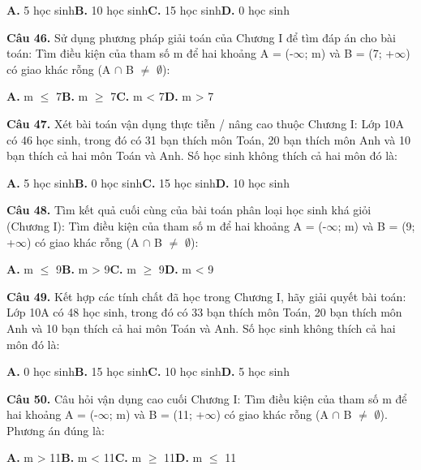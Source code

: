 \documentclass[11pt,a4paper]{article}
\begin{document}
\hspace*{1.5em}\textbf{A.} 5 học sinh\quad\quad \textbf{B.} 10 học sinh\quad\quad \textbf{C.} 15 học sinh\quad\quad \textbf{D.} 0 học sinh\par\vspace{2pt}
\textbf{\color{primary} Câu 46.} Sử dụng phương pháp giải toán của Chương I để tìm đáp án cho bài toán: Tìm điều kiện của tham số m để hai khoảng A = (-$\infty$; m) và B = (7; +$\infty$) có giao khác rỗng (A $\cap$ B $\ne$ $\emptyset$):\par
\hspace*{1.5em}\textbf{A.} m $\le$ 7\quad\quad \textbf{B.} m $\ge$ 7\quad\quad \textbf{C.} m < 7\quad\quad \textbf{D.} m > 7\par\vspace{2pt}
\textbf{\color{primary} Câu 47.} Xét bài toán vận dụng thực tiễn / nâng cao thuộc Chương I: Lớp 10A có 46 học sinh, trong đó có 31 bạn thích môn Toán, 20 bạn thích môn Anh và 10 bạn thích cả hai môn Toán và Anh. Số học sinh không thích cả hai môn đó là:\par
\hspace*{1.5em}\textbf{A.} 5 học sinh\quad\quad \textbf{B.} 0 học sinh\quad\quad \textbf{C.} 15 học sinh\quad\quad \textbf{D.} 10 học sinh\par\vspace{2pt}
\textbf{\color{primary} Câu 48.} Tìm kết quả cuối cùng của bài toán phân loại học sinh khá giỏi (Chương I): Tìm điều kiện của tham số m để hai khoảng A = (-$\infty$; m) và B = (9; +$\infty$) có giao khác rỗng (A $\cap$ B $\ne$ $\emptyset$):\par
\hspace*{1.5em}\textbf{A.} m $\le$ 9\quad\quad \textbf{B.} m > 9\quad\quad \textbf{C.} m $\ge$ 9\quad\quad \textbf{D.} m < 9\par\vspace{2pt}
\textbf{\color{primary} Câu 49.} Kết hợp các tính chất đã học trong Chương I, hãy giải quyết bài toán: Lớp 10A có 48 học sinh, trong đó có 33 bạn thích môn Toán, 20 bạn thích môn Anh và 10 bạn thích cả hai môn Toán và Anh. Số học sinh không thích cả hai môn đó là:\par
\hspace*{1.5em}\textbf{A.} 0 học sinh\quad\quad \textbf{B.} 15 học sinh\quad\quad \textbf{C.} 10 học sinh\quad\quad \textbf{D.} 5 học sinh\par\vspace{2pt}
\textbf{\color{primary} Câu 50.} Câu hỏi vận dụng cao cuối Chương I: Tìm điều kiện của tham số m để hai khoảng A = (-$\infty$; m) và B = (11; +$\infty$) có giao khác rỗng (A $\cap$ B $\ne$ $\emptyset$). Phương án đúng là:\par
\hspace*{1.5em}\textbf{A.} m > 11\quad\quad \textbf{B.} m < 11\quad\quad \textbf{C.} m $\ge$ 11\quad\quad \textbf{D.} m $\le$ 11\par\vspace{2pt}
\end{document}
